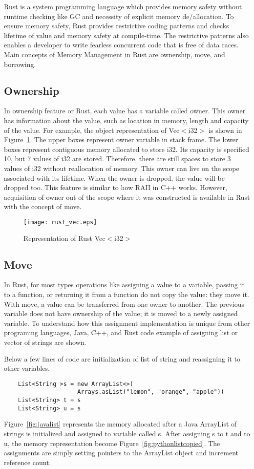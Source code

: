 
Rust is a system programming language which provides memory safety without runtime checking like GC and necessity of explicit memory de/allocation. 
To ensure memory safety, Rust provides restrictive coding patterns and checks lifetime of value and memory safety at compile-time.
The restrictive patterns also enables a developer to write fearless concurrent code that is free of data races.
Main concepts of Memory Management in Rust are ownership, move, and borrowing.

\subsection{Ownership}
In ownership feature or Rust, each value has a variable called owner.
This owner has information about the value, such as location in memory, length and capacity of the value. 
For example, the object representation of Vec$<$i32$>$ is shown in Figure~\ref{fig:rustvec}. The upper boxes represent owner variable in stack frame. 
The lower boxes represent contiguous memory allocated to store i32. Its capacity is specified 10, but 7 values of i32 are stored. 
Therefore, there are still spaces to store 3 values of i32 without reallocation of memory. This owner can live on the scope associated with its lifetime.
When the owner is dropped, the value will be dropped too. This feature is similar to how RAII in C++ works. 
However, acquisition of owner out of the scope where it was constructed is available in Rust with the concept of move. 

\begin{figure}[htb]
    \texttt{[image: rust\_vec.eps]}
    \caption{Representation of Rust Vec$<$i32$>$}
    \label{fig:rustvec}
\end{figure}


\subsection{Move}
In Rust, for most types operations like assigning a value to a variable, passing it to a function, or returning it from a function do not copy the value: they move it. 
With move, a value can be transferred from one owner to another. The previous variable does not have ownership of the value; it is moved to a newly assigned variable. 
To understand how this assignment implementation is unique from other programing languages, Java, C++, and Rust code example of assigning list or vector of strings are shown.

Below a few lines of code are initialization of list of string and reassigning it to other variables. 
\begin{lstlisting}
    List<String >s = new ArrayList<>(
                     Arrays.asList("lemon", "orange", "apple"))
    List<String> t = s
    List<String> u = s
 \end{lstlisting}
Figure~\ref{fig:javalist} represents the memory allocated after a Java ArrayList of strings is initialized and assigned to variable called s. After assigning s to t and to u, 
the memory representation become Figure~\ref{fig:pythonlistcopied}. The assignments are simply setting pointers to the ArrayList object and increment reference count. 

